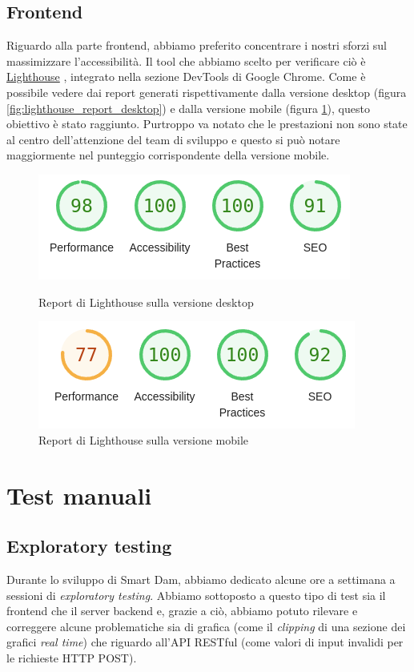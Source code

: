 \documentclass[a4paper,12pt]{report}
\newcommand{\lighthouse}{\href{https://chrome.google.com/webstore/detail/lighthouse/blipmdconlkpinefehnmjammfjpmpbjk?hl=it}{Lighthouse} }
\begin{document}
\subsection{Frontend}
Riguardo alla parte frontend, abbiamo preferito concentrare i nostri sforzi sul massimizzare l'accessibilità. Il tool che abbiamo scelto per verificare ciò è \lighthouse, integrato nella sezione DevTools di Google Chrome. Come è possibile vedere dai report generati rispettivamente dalla versione desktop (figura \ref{fig:lighthouse_report_desktop}) e dalla versione mobile (figura \ref{fig:lighthouse_report_mobile}), questo obiettivo è stato raggiunto. Purtroppo va notato che le prestazioni non sono state al centro dell'attenzione del team di sviluppo e questo si può notare maggiormente nel punteggio corrispondente della versione mobile.

\begin{figure}
    \centering
    \begin{minipage}{0.45\textwidth}
        \includegraphics[scale=0.5]{lighthouse_report_desktop}
        \caption{Report di Lighthouse sulla versione desktop}
        \label{fig:lighthouse_report_desktop}
    \end{minipage}
    \hfill
    \begin{minipage}{0.45\textwidth}
        \includegraphics[scale=0.5]{lighthouse_report_mobile}
        \caption{Report di Lighthouse sulla versione mobile}
        \label{fig:lighthouse_report_mobile}
    \end{minipage}
\end{figure}

\section{Test manuali}
\subsection{Exploratory testing}
Durante lo sviluppo di Smart Dam, abbiamo dedicato alcune ore a settimana a sessioni di \emph{exploratory testing}. Abbiamo sottoposto a questo tipo di test sia il frontend che il server backend e, grazie a ciò, abbiamo potuto rilevare e correggere alcune problematiche sia di grafica (come il \emph{clipping} di una sezione dei grafici \emph{real time}) che riguardo all'API RESTful (come valori di input invalidi per le richieste HTTP POST).
\end{document}
